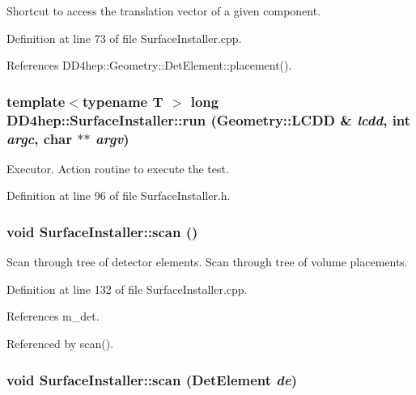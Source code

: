 Shortcut to access the translation vector of a given component. 

Definition at line 73 of file SurfaceInstaller.cpp.

References DD4hep::Geometry::DetElement::placement().\hypertarget{class_d_d4hep_1_1_surface_installer_ad33b6be30b4f7defecb2f1b256b92bb9}{
\subsubsection[{run}]{\setlength{\rightskip}{0pt plus 5cm}template$<$typename T $>$ long DD4hep::SurfaceInstaller::run ({\bf Geometry::LCDD} \& {\em lcdd}, \/  int {\em argc}, \/  char $\ast$$\ast$ {\em argv})}}
\label{class_d_d4hep_1_1_surface_installer_ad33b6be30b4f7defecb2f1b256b92bb9}


Executor. Action routine to execute the test. 

Definition at line 96 of file SurfaceInstaller.h.\hypertarget{class_d_d4hep_1_1_surface_installer_ac0d1ae22918e04feaba80f6e928f8d45}{
\subsubsection[{scan}]{\setlength{\rightskip}{0pt plus 5cm}void SurfaceInstaller::scan ()}}
\label{class_d_d4hep_1_1_surface_installer_ac0d1ae22918e04feaba80f6e928f8d45}


Scan through tree of detector elements. Scan through tree of volume placements. 

Definition at line 132 of file SurfaceInstaller.cpp.

References m\_\-det.

Referenced by scan().\hypertarget{class_d_d4hep_1_1_surface_installer_ade9e70ab94841f49b0c070e1c7a3e16a}{
\subsubsection[{scan}]{\setlength{\rightskip}{0pt plus 5cm}void SurfaceInstaller::scan ({\bf DetElement} {\em de})}}
\label{class_d_d4hep_1_1_surface_installer_ade9e70ab94841f49b0c070e1c7a3e16a}


